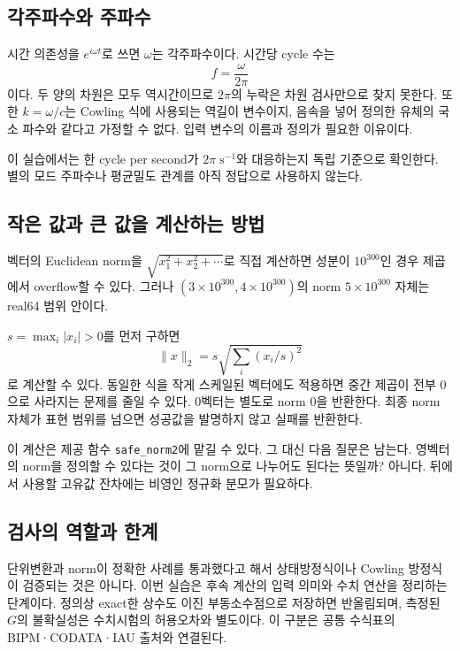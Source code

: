\documentclass[
  10pt,
  a4paper,
]{article}
\begin{document}
\subsection{각주파수와
주파수}\label{uxac01uxc8fcuxd30cuxc218uxc640-uxc8fcuxd30cuxc218}

시간 의존성을 \(e^{i\omega t}\)로 쓰면 \(\omega\)는 각주파수이다. 시간당
cycle 수는 \[
f=\frac{\omega}{2\pi}
\] 이다. 두 양의 차원은 모두 역시간이므로 \(2\pi\)의 누락은 차원
검사만으로 찾지 못한다. 또한 \(k=\omega/c\)는 Cowling 식에 사용되는
역길이 변수이지, 음속을 넣어 정의한 유체의 국소 파수와 같다고 가정할 수
없다. 입력 변수의 이름과 정의가 필요한 이유이다.

이 실습에서는 한 cycle per second가 \(2\pi\;\mathrm{s^{-1}}\)와
대응하는지 독립 기준으로 확인한다. 별의 모드 주파수나 평균밀도 관계를
아직 정답으로 사용하지 않는다.

\subsection{작은 값과 큰 값을 계산하는
방법}\label{uxc791uxc740-uxac12uxacfc-uxd070-uxac12uxc744-uxacc4uxc0b0uxd558uxb294-uxbc29uxbc95}

벡터의 Euclidean norm을 \(\sqrt{x_1^2+x_2^2+\cdots}\)로 직접 계산하면
성분이 \(10^{300}\)인 경우 제곱에서 overflow할 수 있다. 그러나
\((3\times10^{300},4\times10^{300})\)의 norm \(5\times10^{300}\) 자체는
real64 범위 안이다.

\(s=\max_i|x_i|>0\)를 먼저 구하면 \[
\|x\|_2=s\sqrt{\sum_i(x_i/s)^2}
\] 로 계산할 수 있다. 동일한 식을 작게 스케일된 벡터에도 적용하면 중간
제곱이 전부 0으로 사라지는 문제를 줄일 수 있다. 0벡터는 별도로 norm 0을
반환한다. 최종 norm 자체가 표현 범위를 넘으면 성공값을 발명하지 않고
실패를 반환한다.

이 계산은 제공 함수 \texttt{safe\_norm2}에 맡길 수 있다. 그 대신 다음
질문은 남는다. 영벡터의 norm을 정의할 수 있다는 것이 그 norm으로
나누어도 된다는 뜻일까? 아니다. 뒤에서 사용할 고유값 잔차에는 비영인
정규화 분모가 필요하다.

\subsection{검사의 역할과
한계}\label{uxac80uxc0acuxc758-uxc5eduxd560uxacfc-uxd55cuxacc4}

단위변환과 norm이 정확한 사례를 통과했다고 해서 상태방정식이나 Cowling
방정식이 검증되는 것은 아니다. 이번 실습은 후속 계산의 입력 의미와 수치
연산을 정리하는 단계이다. 정의상 exact한 상수도 이진 부동소수점으로
저장하면 반올림되며, 측정된 \(G\)의 불확실성은 수치시험의 허용오차와
별도이다. 이 구분은 공통 수식표의 BIPM·CODATA·IAU 출처와 연결된다.
\end{document}
